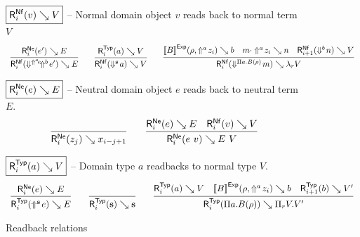 \begin{figure}
  \raggedright
  \noindent
  $\boxed{\rbnf v V}$ -- Normal domain object $v$ reads back to normal term $V$
  \[
  \begin{array}{c}
    \infer{
      \rbnf {\dreify {\dreflect {a} {e}} {\dreflect b e'}} E
    }{
      \rbne {e'} E
    }
    \qquad
    \infer{
      \rbnf {\dreify {\dcst s} a} V
    }{
      \rbtyp a V
    }
    \qquad
    \infer{
      \rbnf {\dreify {\dpi a B \rho} m} {\tmlam V}
    }{
      \evalexp B {\rho, \dreflect a {z_i}} b
      &
      \evalapp m {\dreflect a {z_i}} n
      &
      \rbnf[i+1] {\dreify b n} V
    }
  \end{array}
  \]

  \noindent
  $\boxed{\rbne e E}$ -- Neutral domain object $e$ reads back to neutral term $E$.
  \[
  \begin{array}{c}
    \infer{
      \rbne {z_j} {x_{i - j + 1}}
    }{
    }
    \qquad
    \infer{
      \rbne {\dapp e v} {\tmapp E V}
    }{
      \rbne e E
      &
      \rbnf v V
    }
  \end{array}
  \]

  \noindent
  $\boxed{\rbtyp a V}$ -- Domain type $a$ readbacks to normal type $V$.
  \[
  \begin{array}{c}
    \infer{
      \rbtyp {\dreflect {\tmcst s} e} E
    }{
      \rbne e E
    }
    \qquad
    \infer{
      \rbtyp {\tmcst s} {\tmcst s}
    }{
    }
    \qquad
    \infer{
      \rbtyp {\dpi a B \rho} {\tppi V {V'}}
    }{
      \rbtyp a V
      &
      \evalexp B {\rho, \dreflect a {z_i}} b
      &
      \rbtyp[i+1] b {V'}
    }
  \end{array}
  \]
  \caption{Readback relations}
  \label{fig:readback}
\end{figure}
